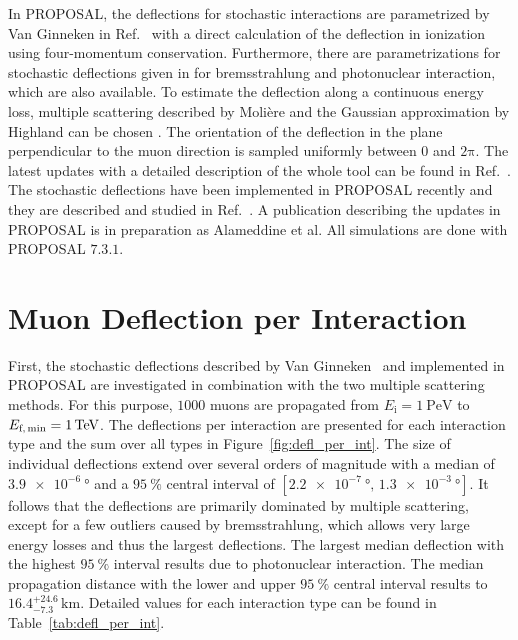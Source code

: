 In PROPOSAL, the deflections for stochastic interactions are parametrized by Van Ginneken 
in Ref.~\cite{Van_Ginneken} with a direct calculation of the deflection in 
ionization using four-momentum conservation. 
Furthermore, there are parametrizations for stochastic deflections given in  \cite{GEANT4} 
for bremsstrahlung and photonuclear interaction, which 
are also available.
To estimate the deflection along 
a continuous energy loss, multiple scattering described by Molière 
\cite{moliere_scattering} and the Gaussian approximation by Highland 
can be chosen \cite{HIGHLAND_1975}. 
The orientation of the deflection in the plane perpendicular to the muon direction is 
sampled uniformly between $0$ and $2\mathrm{\pi}$.
The latest updates with a detailed description of the whole tool can be found 
in Ref.~\cite{phd_soedingrekso}. 
The stochastic deflections have been implemented in PROPOSAL recently and they are 
described and studied in Ref.~\cite{Gutjahr_2021}.
A publication describing the 
updates in PROPOSAL is in preparation as Alameddine et al.
All simulations are done with PROPOSAL $7.3.1$.

\section{Muon Deflection per Interaction}\label{sec:defl_per_int}
First, the stochastic deflections described by Van Ginneken~\cite{Van_Ginneken} 
and implemented 
in PROPOSAL are investigated in combination with the two multiple scattering methods. 
For this purpose, $\num{1000}$ muons are propagated from $E_{\text{i}} = \SI{1}{\peta\electronvolt}$ to $E_{\text{f,\,min}} = \SI{1}{\tera\electronvolt}$.
The deflections per interaction are presented 
for each interaction type and the sum over all types in Figure~\ref{fig:defl_per_int}. 
The size of individual deflections 
extend over several orders of magnitude with a median of $\SI{3.9e-6}{\degree}$
and a $\SI{95}{\percent}$ central interval of $[\SI{2.2e-7}{\degree}, \,\SI{1.3e-3}{\degree}]$. 
It follows that the deflections are primarily dominated by multiple scattering, except for a few outliers caused by bremsstrahlung, which 
allows very large energy losses and thus the largest deflections. 
The largest median deflection with the highest $\SI{95}{\percent}$ interval results due to photonuclear interaction.
The median propagation distance with the lower and upper $\SI{95}{\percent}$ 
central interval results to $16.4_{-7.3}^{+24.6}\,\si{\kilo\meter}$.
Detailed values for each interaction type can be found in Table~\ref{tab:defl_per_int}.

